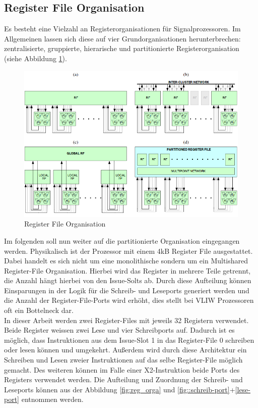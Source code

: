 \subsection{Register File Organisation}
Es besteht eine Vielzahl an Registerorganisationen für Signalprozessoren. Im Allgemeinen lassen sich diese auf vier Grundorganisationen herunterbrechen: zentralisierte, gruppierte, hierarische und partitionierte Registerorganisation (siehe Abbildung \ref{fig:RegisterOrga}).\newline
\begin{figure}[htbp] 
	\centering
	\includegraphics[width=\textwidth]{fig/Register_orga.png}
	\caption{Register File Organisation  \cite{paya2010multi}}
	\label{fig:RegisterOrga}
\end{figure}
Im folgenden soll nun weiter auf die partitionierte Organisation eingegangen werden. Physikalisch ist der Prozessor mit einem 4kB Register File ausgestattet. Dabei handelt es sich nicht um eine monolithische sondern um ein Multishared Register-File Organisation. Hierbei wird das Register in mehrere Teile getrennt, die Anzahl hängt hierbei von den Issue-Solts ab. Durch diese Aufteilung können Einsparungen in der Logik für die Schreib- und Leseports generiert werden und die Anzahl der Register-File-Ports wird erhöht, dies stellt bei VLIW Prozessoren oft ein Bottelneck dar.\\
In dieser Arbeit werden zwei Register-Files mit jeweils 32 Registern verwendet. Beide Register weissen zwei Lese und vier Schreibports auf. Dadurch ist es möglich, dass Instruktionen aus dem Issue-Slot 1 in das Register-File 0 schreiben oder lesen können und umgekehrt. Außerdem wird durch diese Architektur ein Schreiben und Lesen zweier Instruktionen auf das selbe Register-File möglich gemacht. Des weiteren können im Falle einer X2-Instruktion beide Ports des Registers verwendet werden. Die Aufteilung und  Zuordnung der Schreib- und Leseports können aus der Abbildung \ref{fig:reg_orga} und \autoref{fig::schreib-port}+\ref{lese-port} entnommen werden.

